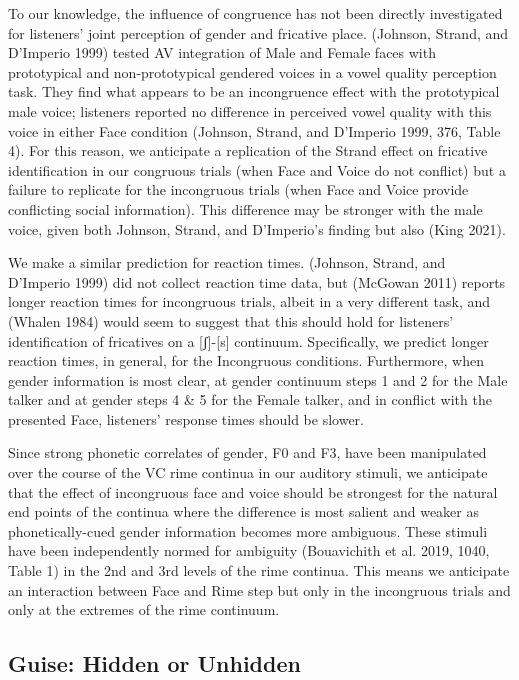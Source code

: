 \documentclass[
  letterpaper,
  DIV=11,
  numbers=noendperiod]{scrartcl}
\begin{document}
To our knowledge, the influence of congruence has not been directly
investigated for listeners' joint perception of gender and fricative
place. (Johnson, Strand, and D'Imperio 1999) tested AV integration of
Male and Female faces with prototypical and non-prototypical gendered
voices in a vowel quality perception task. They find what appears to be
an incongruence effect with the prototypical male voice; listeners
reported no difference in perceived vowel quality with this voice in
either Face condition (Johnson, Strand, and D'Imperio 1999, 376, Table
4). For this reason, we anticipate a replication of the Strand effect on
fricative identification in our congruous trials (when Face and Voice do
not conflict) but a failure to replicate for the incongruous trials
(when Face and Voice provide conflicting social information). This
difference may be stronger with the male voice, given both Johnson,
Strand, and D'Imperio's finding but also (King 2021).

We make a similar prediction for reaction times. (Johnson, Strand, and
D'Imperio 1999) did not collect reaction time data, but (McGowan 2011)
reports longer reaction times for incongruous trials, albeit in a very
different task, and (Whalen 1984) would seem to suggest that this should
hold for listeners' identification of fricatives on a {[}ʃ{]}-{[}s{]}
continuum. Specifically, we predict longer reaction times, in general,
for the Incongruous conditions. Furthermore, when gender information is
most clear, at gender continuum steps 1 and 2 for the Male talker and at
gender steps 4 \& 5 for the Female talker, and in conflict with the
presented Face, listeners' response times should be slower.

Since strong phonetic correlates of gender, F0 and F3, have been
manipulated over the course of the VC rime continua in our auditory
stimuli, we anticipate that the effect of incongruous face and voice
should be strongest for the natural end points of the continua where the
difference is most salient and weaker as phonetically-cued gender
information becomes more ambiguous. These stimuli have been
independently normed for ambiguity (Bouavichith et al. 2019, 1040, Table
1) in the 2nd and 3rd levels of the rime continua. This means we
anticipate an interaction between Face and Rime step but only in the
incongruous trials and only at the extremes of the rime continuum.

\subsection{Guise: Hidden or Unhidden}\label{guise-hidden-or-unhidden}
\end{document}
